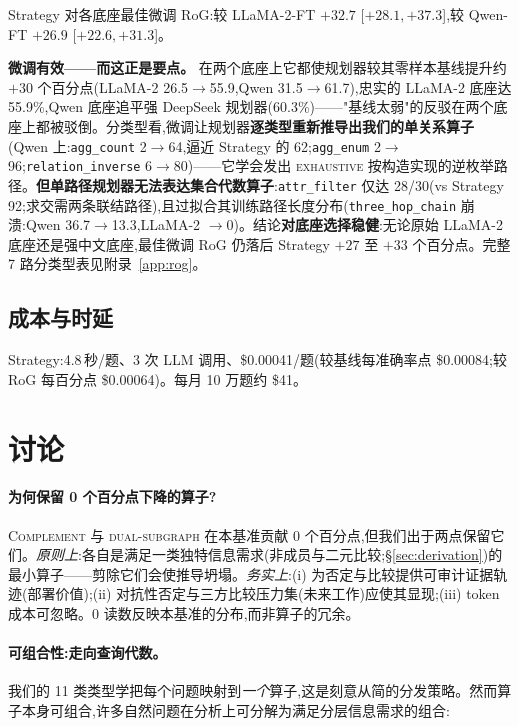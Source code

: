 \documentclass[11pt,a4paper]{article}
\newcommand{\qtype}[1]{\texttt{\small #1}}
\newcommand{\op}[1]{\textsc{\small #1}}
\begin{document}
Strategy 对各底座最佳微调 RoG:较 LLaMA-2-FT $+32.7$ [$+28.1,+37.3$],较 Qwen-FT $+26.9$ [$+22.6,+31.3$]。

\textbf{微调有效——而这正是要点。} 在两个底座上它都使规划器较其零样本基线提升约 $+30$ 个百分点(LLaMA-2 26.5$\to$55.9,Qwen 31.5$\to$61.7),忠实的 LLaMA-2 底座达 55.9\%,Qwen 底座追平强 DeepSeek 规划器(60.3\%)——"基线太弱"的反驳在两个底座上都被驳倒。分类型看,微调让规划器\textbf{逐类型重新推导出我们的单关系算子}(Qwen 上:\qtype{agg\_count} 2$\to$64,逼近 Strategy 的 62;\qtype{agg\_enum} 2$\to$96;\qtype{relation\_inverse} 6$\to$80)——它学会发出 \op{exhaustive} 按构造实现的逆枚举路径。\textbf{但单路径规划器无法表达集合代数算子}:\qtype{attr\_filter} 仅达 28/30(vs Strategy 92;求交需两条联结路径),且过拟合其训练路径长度分布(\qtype{three\_hop\_chain} 崩溃:Qwen 36.7$\to$13.3,LLaMA-2 $\to$0)。结论\textbf{对底座选择稳健}:无论原始 LLaMA-2 底座还是强中文底座,最佳微调 RoG 仍落后 Strategy $+27$ 至 $+33$ 个百分点。完整 7 路分类型表见附录~\ref{app:rog}。

\subsection{成本与时延}
Strategy:4.8\,秒/题、3 次 LLM 调用、\$0.00041/题(较基线每准确率点 \$0.00084;较 RoG 每百分点 \$0.00064)。每月 10 万题约 \$41。

\section{讨论}
\label{sec:discussion}

\paragraph{为何保留 0 个百分点下降的算子?}
\op{Complement} 与 \op{dual-subgraph} 在本基准贡献 0 个百分点,但我们出于两点保留它们。\emph{原则上}:各自是满足一类独特信息需求(非成员与二元比较;\S\ref{sec:derivation})的最小算子——剪除它们会使推导坍塌。\emph{务实上}:(i) 为否定与比较提供可审计证据轨迹(部署价值);(ii) 对抗性否定与三方比较压力集(未来工作)应使其显现;(iii) token 成本可忽略。0 读数反映本基准的分布,而非算子的冗余。

\paragraph{可组合性:走向查询代数。}
我们的 11 类类型学把每个问题映射到\emph{一个}算子,这是刻意从简的分发策略。然而算子本身可组合,许多自然问题在分析上可分解为满足分层信息需求的组合:
\end{document}
